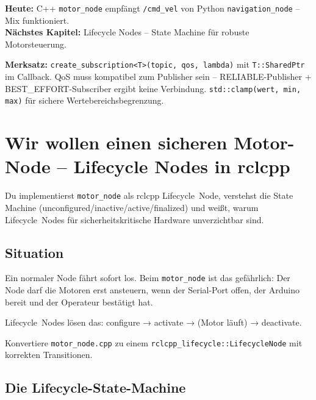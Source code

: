 \begin{projektBox}
\textbf{Heute:} C++ \texttt{motor\_node} empfängt \texttt{/cmd\_vel}
von Python \texttt{navigation\_node} -- Mix funktioniert.\\
\textbf{Nächstes Kapitel:} Lifecycle Nodes -- State Machine für robuste Motorsteuerung.
\end{projektBox}

\begin{merksatzBox}
\textbf{Merksatz:}
\texttt{create\_subscription<T>(topic, qos, lambda)} mit \texttt{T::SharedPtr} im Callback.
QoS muss kompatibel zum Publisher sein --
RELIABLE-Publisher + BEST\_EFFORT-Subscriber ergibt keine Verbindung.
\texttt{std::clamp(wert, min, max)} für sichere Wertebereichsbegrenzung.
\end{merksatzBox}


\chapter{Wir wollen einen sicheren Motor-Node –
  Lifecycle Nodes in rclcpp}

\begin{lernziele}
Du implementierst \texttt{motor\_node} als rclcpp Lifecycle~Node,
verstehst die State Machine (unconfigured/inactive/active/finalized)
und weißt, warum Lifecycle~Nodes für sicherheitskritische Hardware unverzichtbar sind.
\end{lernziele}

\section{Situation}

Ein normaler Node fährt sofort los.
Beim \texttt{motor\_node} ist das gefährlich:
Der Node darf die Motoren erst ansteuern,
wenn der Serial-Port offen, der Arduino bereit
und der Operateur bestätigt hat.

Lifecycle~Nodes lösen das: configure → activate → (Motor läuft) → deactivate.

\begin{aufgabeBox}
Konvertiere \texttt{motor\_node.cpp} zu einem
\texttt{rclcpp\_lifecycle::LifecycleNode}
mit korrekten Transitionen.
\end{aufgabeBox}

\section{Die Lifecycle-State-Machine}

